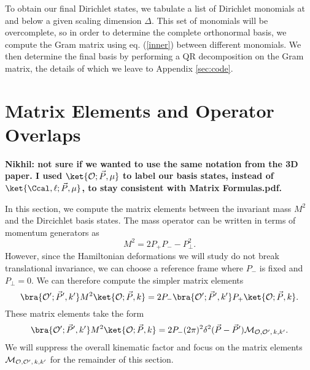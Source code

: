 {To obtain our final Dirichlet states, we tabulate a list of Dirichlet monomials at and below a given scaling dimension $\Delta$. This set of monomials will be overcomplete, so in order to determine the complete orthonormal basis, we compute the Gram matrix using eq. (\ref{inner}) between different monomials. We then determine the final basis by performing a QR decomposition on the Gram matrix, the details of which we leave to Appendix \ref{sec:code}.



\section{Matrix Elements and Operator Overlaps}
\label{sec:MatrixElements}

{\color{red}\textbf{Nikhil: not sure if we wanted to use the same notation from the 3D paper. I used $\ket{\Ocal; \vec{P}, \mu}$ to label our basis states, instead of $\ket{\Ccal, \ell; \vec{P}, \mu}$, to stay consistent with Matrix Formulas.pdf.}}

In this section, we compute the matrix elements between the invariant mass $M^2$ and the Dircichlet basis states. The mass operator can be written in terms of momentum generators as \begin{equation}
	M^2 = 2P_+ P_- - P_\bot^2.
\end{equation} However, since the Hamiltonian deformations we will study do not break translational invariance, we can choose a reference frame where $P_-$ is fixed and $P_\bot = 0$. We can therefore compute the simpler matrix elements \begin{equation}
	\bra{\Ocal'; \vec{P}', k'} M^2 \ket{\Ocal; \vec{P}, k} = 2P_- \bra{\Ocal'; \vec{P}', k'} P_+ \ket{\Ocal; \vec{P}, k}.
\end{equation} These matrix elements take the form \begin{equation}
	\begin{aligned}
		\bra{\Ocal'; \vec{P}', k'} M^2 \ket{\Ocal; \vec{P}, k} = 2P_- (2\pi)^2 \delta^2(\vec{P}- \vec{P}') {\Mcal}_{\Ocal,\Ocal', \, k, k'}.
	\end{aligned}
\end{equation} We will suppress the overall kinematic factor and focus on the matrix elements $ {\cal M}_{{\cal O},{\cal O}', \, k, k'}$ for the remainder of this section.

}
